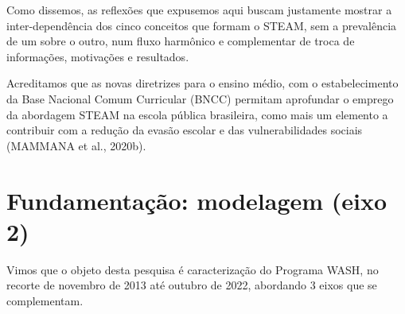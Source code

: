 \documentclass[
12pt,		%
openright,	%
twoside,  %
a4paper,			%
chapter=TITLE,		%
english,			%
french,				%
spanish,			%
brazil				%
]{USPSC-classe/USPSC}
\begin{document}
Como dissemos, as reflex\~oes que expusemos aqui buscam justamente mostrar a inter-depend\^encia dos cinco conceitos que formam o STEAM, sem a preval\^encia de um sobre o outro, num fluxo harm\^onico e complementar de troca de informa\c{c}\~oes, motiva\c{c}\~oes e resultados.










\noindent\begin{center}\mbox{\centering{}}\end{center}


Acreditamos que as novas diretrizes para o ensino m\'edio, com o estabelecimento da Base Nacional Comum Curricular (BNCC) permitam aprofundar o emprego da abordagem STEAM na escola p\'ublica brasileira, como mais um elemento a contribuir com a redu\c{c}\~ao da evas\~ao escolar e das vulnerabilidades sociais  (MAMMANA et al., 2020b).









\section[Fundamenta\c{c}\~ao: modelagem (eixo 2)]{Fundamenta\c{c}\~ao: modelagem (eixo 2)}\label{Fundamenta\c{c}\~ao: modelagem (eixo 2)}
Vimos que o objeto desta pesquisa \'e caracteriza\c{c}\~ao do Programa WASH, no recorte de novembro de 2013 at\'e outubro de 2022, abordando 3 eixos que se complementam.
\end{document}
